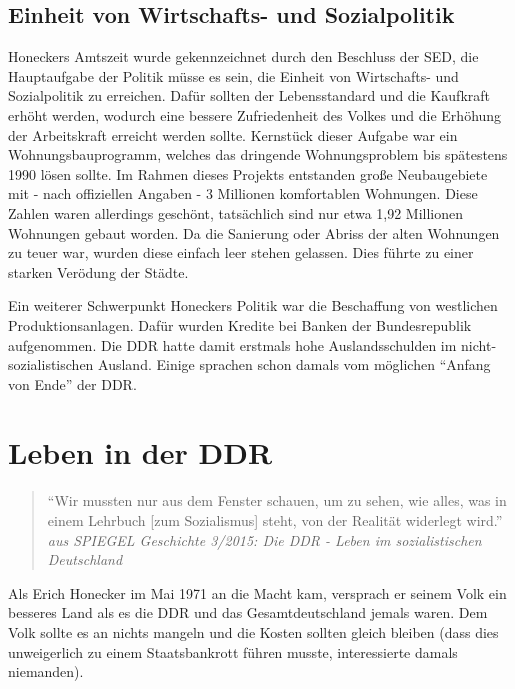 \documentclass[12pt,a4paper]{article}
\begin{document}
\subsection{Einheit von Wirtschafts- und Sozialpolitik}
\label{sub:wohnung}

Honeckers Amtszeit wurde gekennzeichnet durch den Beschluss der SED, die Hauptaufgabe der Politik müsse es sein, die Einheit von Wirtschafts- und Sozialpolitik zu erreichen. Dafür sollten der Lebensstandard und die Kaufkraft erhöht werden, wodurch eine bessere Zufriedenheit des Volkes und die Erhöhung der Arbeitskraft erreicht werden sollte.
Kernstück dieser Aufgabe war ein Wohnungsbauprogramm, welches das dringende Wohnungsproblem bis spätestens 1990 lösen sollte.
Im Rahmen dieses Projekts entstanden große Neubaugebiete mit - nach offiziellen Angaben - 3 Millionen komfortablen Wohnungen. Diese Zahlen waren allerdings geschönt, tatsächlich sind nur etwa 1,92 Millionen Wohnungen gebaut worden.
Da die Sanierung oder Abriss der alten Wohnungen zu teuer war, wurden diese einfach leer stehen gelassen. Dies führte zu einer starken Verödung der Städte.

Ein weiterer Schwerpunkt Honeckers Politik war die Beschaffung von westlichen Produktionsanlagen. Dafür wurden Kredite bei Banken der Bundesrepublik aufgenommen. Die DDR hatte damit erstmals hohe Auslandsschulden im nicht-sozialistischen Ausland. Einige sprachen schon damals vom möglichen \enquote{Anfang von Ende} der DDR.




\newpage



\section{Leben in der DDR}
\label{sec:leben}

\begin{quotation}
    \enquote{Wir mussten nur aus dem Fenster schauen, um zu sehen, wie alles, was in einem Lehrbuch [zum Sozialismus] steht, von der Realität widerlegt wird.} \\
    \it aus SPIEGEL Geschichte 3/2015: Die DDR - Leben im sozialistischen Deutschland
\end{quotation}

Als Erich Honecker im Mai 1971 an die Macht kam, versprach er seinem Volk ein besseres Land als es die DDR und das Gesamtdeutschland jemals waren. Dem Volk sollte es an nichts mangeln und die Kosten sollten gleich bleiben (dass dies unweigerlich zu einem Staatsbankrott führen musste, interessierte damals niemanden). 
\end{document}
